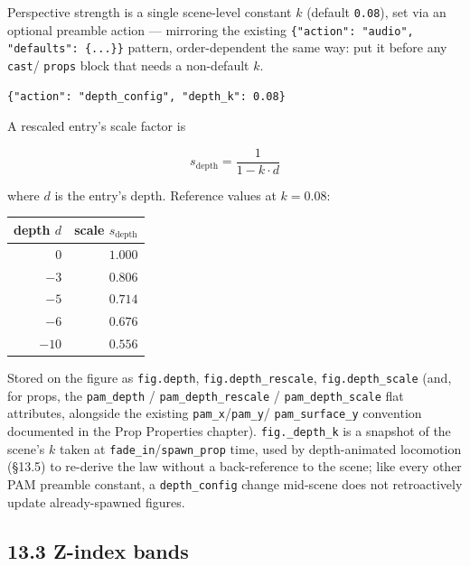\documentclass[
  11pt,
]{book}
\begin{document}
Perspective strength is a single scene-level constant $k$ (default
\texttt{0.08}), set via an optional preamble action --- mirroring the
existing \texttt{\{"action": "audio", "defaults": \{...\}\}} pattern,
order-dependent the same way: put it before any \texttt{cast}/
\texttt{props} block that needs a non-default $k$.

\begin{verbatim}
{"action": "depth_config", "depth_k": 0.08}
\end{verbatim}

A rescaled entry's scale factor is

\[ s_{\mathrm{depth}} = \frac{1}{1 - k \cdot d} \]

where $d$ is the entry's depth. Reference values at $k = 0.08$:

\begin{center}
\begin{tabular}{r r}
depth $d$ & scale $s_{\mathrm{depth}}$ \\
\hline
$0$    & $1.000$ \\
$-3$   & $0.806$ \\
$-5$   & $0.714$ \\
$-6$   & $0.676$ \\
$-10$  & $0.556$ \\
\end{tabular}
\end{center}

Stored on the figure as \texttt{fig.depth}, \texttt{fig.depth\_rescale},
\texttt{fig.depth\_scale} (and, for props, the \texttt{pam\_depth} /
\texttt{pam\_depth\_rescale} / \texttt{pam\_depth\_scale} flat
attributes, alongside the existing \texttt{pam\_x}/\texttt{pam\_y}/
\texttt{pam\_surface\_y} convention documented in the Prop Properties
chapter). \texttt{fig.\_depth\_k} is a snapshot of the scene's $k$
taken at \texttt{fade\_in}/\texttt{spawn\_prop} time, used by
depth-animated locomotion (\S13.5) to re-derive the law without a
back-reference to the scene; like every other PAM preamble constant, a
\texttt{depth\_config} change mid-scene does not retroactively update
already-spawned figures.

\subsection{\texorpdfstring{13.3 Z-index bands}{13.3 Z-index bands}}\label{z-index-bands}
\end{document}
